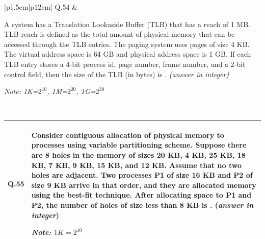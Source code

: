 \documentclass[14pt]{article}
\begin{document}
\vspace{0.3cm}

\begin{tabular}{|p{1.5cm}|p{12cm}|}
\hline
Q.54 &
\parbox[t]{\linewidth}{
A system has a Translation Lookaside Buffer (TLB) that has a reach of 1 MB. TLB reach is defined as the total amount of physical memory that can be accessed through the TLB entries. The paging system uses pages of size 4 KB. The virtual address space is 64 GB and physical address space is 1 GB. If each TLB entry stores a 4-bit process id, page number, frame number, and a 2-bit control field, then the size of the TLB (in bytes) is \underline{\hspace{2cm}}. \textit{(answer in integer)}

\vspace{0.2cm}

\textit{Note: 1K=$2^{10}$, 1M=$2^{20}$, 1G=$2^{30}$}
}
\\
\hline
\end{tabular}

\vspace{0.3cm}

\begin{tabular}{|p{1.5cm}|p{12cm}|}
\hline

Q.55 &
\begin{minipage}[t]{12cm}


Consider contiguous allocation of physical memory to processes using
variable partitioning scheme. Suppose there are 8 holes in the memory
of sizes 20 KB, 4 KB, 25 KB, 18 KB, 7 KB, 9 KB, 15 KB,
and 12 KB. Assume that no two holes are adjacent. Two processes
P1 of size 16 KB and P2 of size 9 KB arrive in that order, and they
are allocated memory using the best-fit technique. After allocating
space to P1 and P2, the number of holes of size less than 8 KB is
\underline{\hspace{2cm}}. 
(\textit{answer in integer})

\vspace{0.3cm}

\textit{Note: $1K=2^{10}$}

\vspace{0.5cm}
\end{minipage}
\\

\hline
\end{tabular}

\vspace{0.3cm}
\end{document}
